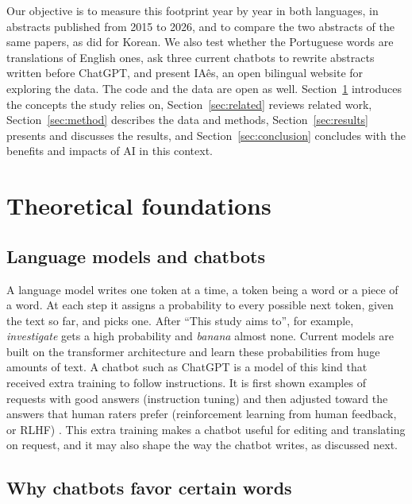 \documentclass[12pt]{article}
\newcommand{\w}[1]{\textit{#1}}
\begin{document}
Our objective is to measure this footprint year by year in both languages, in abstracts published
from 2015 to 2026, and to compare the two abstracts of the same papers, as \cite{lee2026korean} did
for Korean. We also test whether the Portuguese words are translations of English ones, ask three
current chatbots to rewrite abstracts written before ChatGPT, and present IAês, an open bilingual
website for exploring the data. The code and the data are open as well.
Section~\ref{sec:foundations} introduces the concepts the study relies on,
Section~\ref{sec:related} reviews related work, Section~\ref{sec:method} describes the data and
methods, Section~\ref{sec:results} presents and discusses the results, and
Section~\ref{sec:conclusion} concludes with the benefits and impacts of AI in this context.

\section{Theoretical foundations}
\label{sec:foundations}

\subsection{Language models and chatbots}

A language model writes one token at a time, a token being a word or a piece of a word. At each
step it assigns a probability to every possible next token, given the text so far, and picks one.
After ``This study aims to'', for example, \w{investigate} gets a high probability and \w{banana}
almost none. Current models are built on the transformer architecture \cite{vaswani2017attention}
and learn these probabilities from huge amounts of text. A chatbot such as ChatGPT is a model of
this kind that received extra training to follow instructions. It is first shown examples of
requests with good answers (instruction tuning) and then adjusted toward the answers that human
raters prefer (reinforcement learning from human feedback, or RLHF) \cite{ouyang2022training}. This
extra training makes a chatbot useful for editing and translating on request, and it may also shape
the way the chatbot writes, as discussed next.

\subsection{Why chatbots favor certain words}
\label{sec:vocab}
\end{document}
